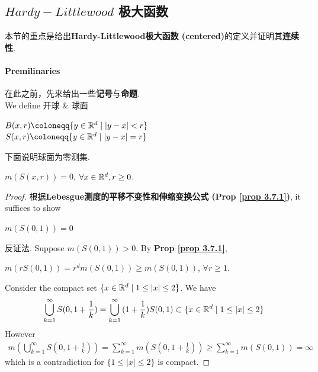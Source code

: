 \subsection{$Hardy-Littlewood$ 极大函数}
	\begin{center}
		本节的重点是给出\textbf{Hardy-Littlewood极大函数 (centered)}的定义并证明其\textbf{连续性}.		
	\end{center}

\vspace{2em}
\paragraph{\textbf{Premilinaries}}
	在此之前，先来给出一些\textbf{记号}与\textbf{命题}. \\
	We define 开球 $\&$ 球面
	\begin{center}
		$B(x , r) \coloneqq \{ y \in \R^d \mid \left| y - x \right| < r \}$ \\
		$S(x , r) \coloneqq \{ y \in \R^d \mid \left| y - x \right| = r \}$
	\end{center}
	
	\vspace{2em}
	下面说明球面为零测集.
	\begin{proposition}\label{prop 4.3.1}
		$m(S(x , r)) = 0$, $\forall x \in \mathbb{R}^d , r \geq 0$.
		
		\vspace{4em}
		\begin{proof}
			根据\textbf{Lebesgue测度的平移不变性和伸缩变换公式 (Prop \ref{prop 3.7.1})}, it suffices to show
			\begin{center}
				$m(S(0 , 1)) = 0$
			\end{center}
			反证法. Suppose $m(S(0 , 1)) > 0$. By \textbf{Prop \ref{prop 3.7.1}},
			\begin{center}
				$m(rS(0 , 1)) = r^d m(S(0 , 1)) \geq m(S(0 , 1))$, $\forall r \geq 1$.
			\end{center}
			Consider the compact set $\{ x \in \mathbb{R}^d \mid 1 \leq \left| x \right| \leq 2 \}$. We have
			\begin{align}
				\bigcup_{k = 1}^{\infty}{S(0 , 1 + \frac{1}{k})} = \bigcup_{k = 1}^{\infty}{(1 + \frac{1}{k}) S(0 , 1)} \subset \{ x \in \mathbb{R}^d \mid 1 \leq \left| x \right| \leq 2 \}
			\end{align}
			However
			\begin{align}
				m\left( \bigcup_{k = 1}^{\infty}{S(0 , 1 + \frac{1}{k})} \right)
				= \sum_{k = 1}^{\infty}{m\left( S(0 , 1 + \frac{1}{k}) \right)}
				\geq \sum_{k = 1}^{\infty}{m\left( S(0 , 1) \right)} 
				= \infty
			\end{align}
			which is a contradiction for $\{ 1 \leq \left| x \right| \leq 2 \}$ is compact.
		\end{proof}
	\end{proposition}

